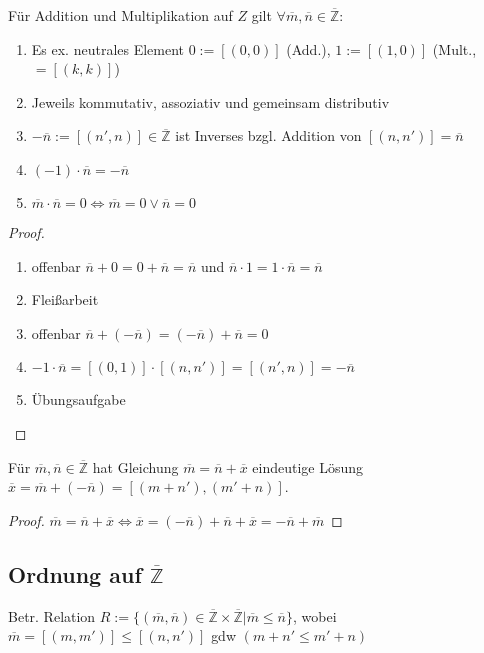 \begin{proposition}
	Für Addition und Multiplikation auf $Z$ gilt $\forall \overline{m},\overline{n}\in\overline{\mathbb{Z}}$:
	\begin{enumerate}[label={\arabic*)}]
		\item Es ex. neutrales Element $0:=[(0,0)]$ (Add.), $1:=[(1,0)]$ (Mult., $=[(k,k)]$)
		\item Jeweils kommutativ, assoziativ und gemeinsam distributiv
		\item $-\overline{n} := [(n',n)]\in\overline{\mathbb{Z}}$ ist Inverses bzgl. Addition von $[(n,n')]=\overline{n}$
		\item $(-1)\cdot \overline{n} = -\overline{n}$
		\item $\overline{m}\cdot\overline{n} = 0 \Leftrightarrow \overline{m} = 0 \lor \overline{n} = 0$
	\end{enumerate}
\end{proposition}
\begin{proof}
	\begin{enumerate}[label={\arabic*)}]
		\item offenbar $\overline{n}+0=0+\overline{n}=\overline{n}$ und $\overline{n}\cdot 1=1\cdot \overline{n}=\overline{n}$
		\item Fleißarbeit
		\item offenbar $\overline{n}+(-\overline{n})=(-\overline{n})+\overline{n}=0$
		\item $-1\cdot\overline{n}=[(0,1)]\cdot[(n,n')]=[(n',n)]=-\overline{n}$
		\item Übungsaufgabe
	\end{enumerate}
\end{proof}

\begin{proposition}
	Für $\overline{m},\overline{n}\in\overline{\mathbb{Z}}$ hat Gleichung $\overline{m} = \overline{n} + \overline{x}$ eindeutige Lösung $\overline{x} = \overline{m} + (-\overline{n}) = [(m+n'),(m'+n)]$.
\end{proposition}
\begin{proof}
	$\overline{m}=\overline{n}+\overline{x}\iff \overline{x}=(-\overline{n})+\overline{n}+\overline{x}=
	-\overline{n}+\overline{m}$
\end{proof}

\subsection{Ordnung auf $\overline{\mathbb{Z}}$}
\begin{definition}
	Betr. Relation $R:=\{(\overline{m},\overline{n})\in\overline{\mathbb{Z}}\times\overline{\mathbb{Z}} | \overline{m} \le \overline{n}\}$, wobei $\overline{m} = [(m,m')] \le [(n,n')]$ \gls{gdw} $(m+n'\le m'+n)$
\end{definition}

